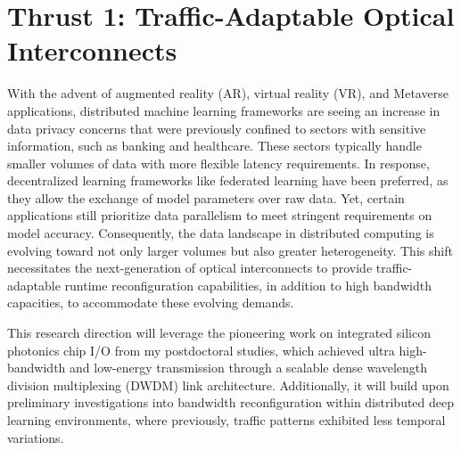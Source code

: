 \section{Thrust 1: Traffic-Adaptable Optical Interconnects}

With the advent of augmented reality (AR), virtual reality (VR), and Metaverse applications, distributed machine learning frameworks are seeing an increase in data privacy concerns that were previously confined to sectors with sensitive information, such as banking and healthcare. These sectors typically handle smaller volumes of data with more flexible latency requirements. In response, decentralized learning frameworks like federated learning have been preferred, as they allow the exchange of model parameters over raw data. Yet, certain applications still prioritize data parallelism to meet stringent requirements on model accuracy. Consequently, the data landscape in distributed computing is evolving toward not only larger volumes but also greater heterogeneity. This shift necessitates the next-generation of optical interconnects to provide traffic-adaptable runtime reconfiguration capabilities, in addition to high bandwidth capacities, to accommodate these evolving demands.

This research direction will leverage the pioneering work on integrated silicon photonics chip I/O from my postdoctoral studies\cite{wangScalableArchitectureSubpJ2023}, which achieved ultra high-bandwidth and low-energy transmission through a scalable dense wavelength division multiplexing (DWDM) link architecture. Additionally, it will build upon preliminary investigations into bandwidth reconfiguration within distributed deep learning environments, where previously, traffic patterns exhibited less temporal variations\cite{brianJOCN}.

